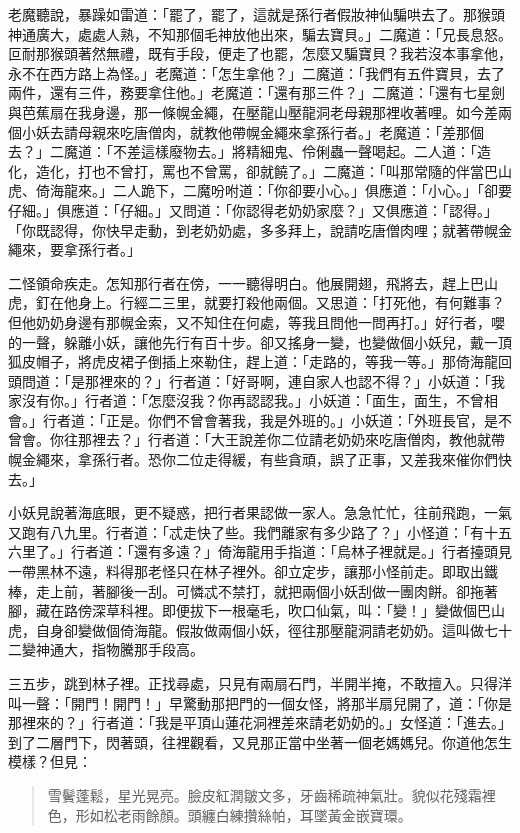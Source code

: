 老魔聽說，暴躁如雷道：「罷了，罷了，這就是孫行者假妝神仙騙哄去了。那猴頭神通廣大，處處人熟，不知那個毛神放他出來，騙去寶貝。」二魔道：「兄長息怒。叵耐那猴頭著然無禮，既有手段，便走了也罷，怎麼又騙寶貝？我若沒本事拿他，永不在西方路上為怪。」老魔道：「怎生拿他？」二魔道：「我們有五件寶貝，去了兩件，還有三件，務要拿住他。」老魔道：「還有那三件？」二魔道：「還有七星劍與芭蕉扇在我身邊，那一條幌金繩，在壓龍山壓龍洞老母親那裡收著哩。如今差兩個小妖去請母親來吃唐僧肉，就教他帶幌金繩來拿孫行者。」老魔道：「差那個去？」二魔道：「不差這樣廢物去。」將精細鬼、伶俐蟲一聲喝起。二人道：「造化，造化，打也不曾打，罵也不曾罵，卻就饒了。」二魔道：「叫那常隨的伴當巴山虎、倚海龍來。」二人跪下，二魔吩咐道：「你卻要小心。」俱應道：「小心。」「卻要仔細。」俱應道：「仔細。」又問道：「你認得老奶奶家麼？」又俱應道：「認得。」「你既認得，你快早走動，到老奶奶處，多多拜上，說請吃唐僧肉哩；就著帶幌金繩來，要拿孫行者。」

二怪領命疾走。怎知那行者在傍，一一聽得明白。他展開翅，飛將去，趕上巴山虎，釘在他身上。行經二三里，就要打殺他兩個。又思道：「打死他，有何難事？但他奶奶身邊有那幌金索，又不知住在何處，等我且問他一問再打。」好行者，嚶的一聲，躲離小妖，讓他先行有百十步。卻又搖身一變，也變做個小妖兒，戴一頂狐皮帽子，將虎皮裙子倒插上來勒住，趕上道：「走路的，等我一等。」那倚海龍回頭問道：「是那裡來的？」行者道：「好哥啊，連自家人也認不得？」小妖道：「我家沒有你。」行者道：「怎麼沒我？你再認認我。」小妖道：「面生，面生，不曾相會。」行者道：「正是。你們不曾會著我，我是外班的。」小妖道：「外班長官，是不曾會。你往那裡去？」行者道：「大王說差你二位請老奶奶來吃唐僧肉，教他就帶幌金繩來，拿孫行者。恐你二位走得緩，有些貪頑，誤了正事，又差我來催你們快去。」

小妖見說著海底眼，更不疑惑，把行者果認做一家人。急急忙忙，往前飛跑，一氣又跑有八九里。行者道：「忒走快了些。我們離家有多少路了？」小怪道：「有十五六里了。」行者道：「還有多遠？」倚海龍用手指道：「烏林子裡就是。」行者擡頭見一帶黑林不遠，料得那老怪只在林子裡外。卻立定步，讓那小怪前走。即取出鐵棒，走上前，著腳後一刮。可憐忒不禁打，就把兩個小妖刮做一團肉餅。卻拖著腳，藏在路傍深草科裡。即便拔下一根毫毛，吹口仙氣，叫：「變！」變做個巴山虎，自身卻變做個倚海龍。假妝做兩個小妖，徑往那壓龍洞請老奶奶。這叫做七十二變神通大，指物騰那手段高。

三五步，跳到林子裡。正找尋處，只見有兩扇石門，半開半掩，不敢擅入。只得洋叫一聲：「開門！開門！」早驚動那把門的一個女怪，將那半扇兒開了，道：「你是那裡來的？」行者道：「我是平頂山蓮花洞裡差來請老奶奶的。」女怪道：「進去。」到了二層門下，閃著頭，往裡觀看，又見那正當中坐著一個老媽媽兒。你道他怎生模樣？但見：
\begin{quote}
雪鬢蓬鬆，星光晃亮。臉皮紅潤皺文多，牙齒稀疏神氣壯。貌似花殘霜裡色，形如松老雨餘顏。頭纏白練攢絲帕，耳墜黃金嵌寶環。
\end{quote}

